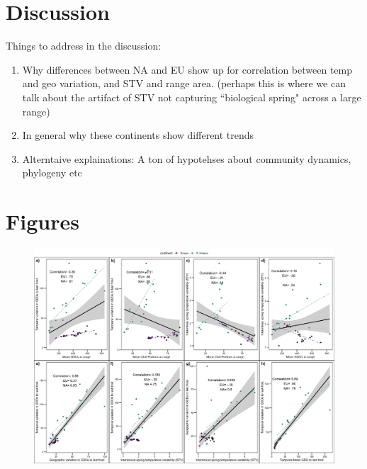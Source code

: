 \documentclass[12pt]{article}\usepackage[]{graphicx}\usepackage[]{color}
\begin{document}
\section*{Discussion}
Things to address in the discussion:
\begin{enumerate}
\item Why differences between NA and EU show up for correlation between temp and geo variation, and STV and range area. (perhaps this is where we can talk about the artifact of STV not capturing ``biological spring" across a large range)
\item In general why these continents show different trends
\item Alterntaive explainations: A ton of hypotehses about community dynamics, phylogeny etc

\end{enumerate}


\section*{Figures}

\begin{figure}[h!]
    \centering
 \includegraphics[width=\textwidth]{..//..//analyses/ranges/figures/clim_params.jpeg} 
    \caption{ }
    \label{fig:corrs}
\end{figure}
\end{document}
